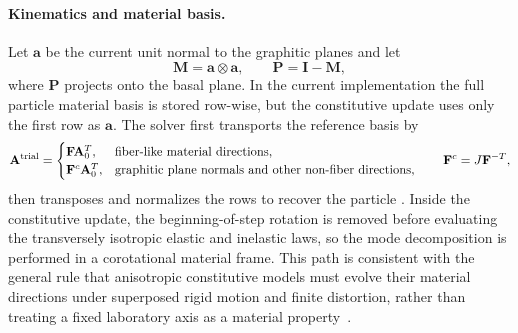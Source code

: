 \paragraph{Kinematics and material basis.}
Let \(\mathbf a\) be the current unit normal to the graphitic planes and let
\begin{equation}
  \mathbf M = \mathbf a\otimes\mathbf a,
  \qquad
  \mathbf P = \mathbf I - \mathbf M,
  \label{eq:graphite-projectors}
\end{equation}
where \(\mathbf P\) projects onto the basal plane.  In the current implementation the full particle material basis is stored row-wise, but the constitutive update uses only the first row as \(\mathbf a\).  The solver first transports the reference basis by
\begin{equation}
  \mathbf A^{\mathrm{trial}} =
  \begin{cases}
    \mathbf F\mathbf A_0^T, & \hbox{fiber-like material directions},\\
    \mathbf F^{c}\mathbf A_0^T, & \hbox{graphitic plane normals and other non-fiber directions},
  \end{cases}
  \qquad
  \mathbf F^{c}=J\mathbf F^{-T},
  \label{eq:graphite-material-direction-update}
\end{equation}
then transposes and normalizes the rows to recover the particle .  Inside the constitutive update, the beginning-of-step rotation is removed before evaluating the transversely isotropic elastic and inelastic laws, so the mode decomposition is performed in a corotational material frame.  This path is consistent with the general rule that anisotropic constitutive models must evolve their material directions under superposed rigid motion and finite distortion, rather than treating a fixed laboratory axis as a material property~\cite{brannon2017rotation}.

